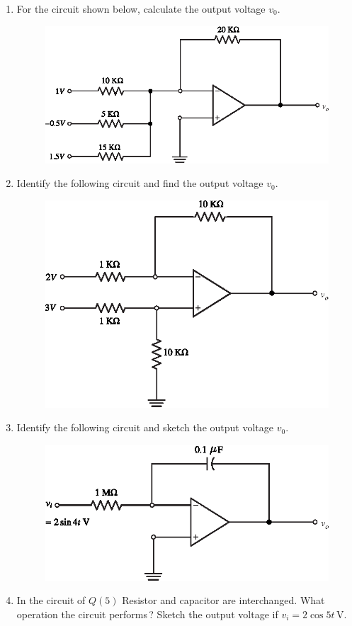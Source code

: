 \begin{enumerate}
\smallskip
\item For the circuit shown below, calculate the output voltage $v_{0}$.
\smallskip
\begin{figure}[H]
\centering
\includegraphics[scale=.9]{addfig/exr5.3.eps}
\end{figure}

\eject

\item Identify the following circuit and find the output voltage $v_{0}$.
\begin{figure}[H]
\centering
\includegraphics[scale=.9]{addfig/exr5.4.eps}
\end{figure}

\item Identify the following circuit and sketch the output voltage $v_{0}$.
\begin{figure}[H]
\centering
\includegraphics[scale=.9]{addfig/exr5.5.eps}
\end{figure}

\item In the circuit of $Q(5)$ Resistor and capacitor are interchanged. What operation the circuit performs\,? Sketch the output voltage if $v_{i}=2\cos 5t$\,V.
\end{enumerate}
